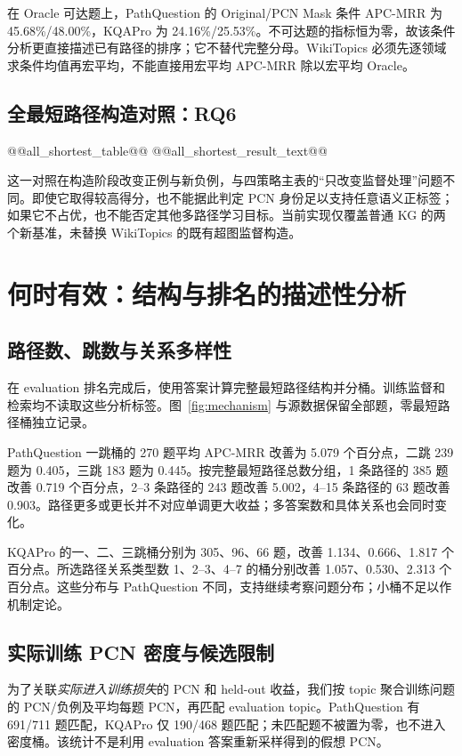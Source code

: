\documentclass[UTF8,a4paper,10pt,fontset=fandol]{ctexart}
\begin{document}
在 Oracle 可达题上，PathQuestion 的 Original/PCN Mask 条件 APC-MRR 为 45.68\%/48.00\%，KQAPro 为 24.16\%/25.53\%。不可达题的指标恒为零，故该条件分析更直接描述已有路径的排序；它不替代完整分母。WikiTopics 必须先逐领域求条件均值再宏平均，不能直接用宏平均 APC-MRR 除以宏平均 Oracle。

\subsection{全最短路径构造对照：RQ6}
@@all_shortest_table@@
@@all_shortest_result_text@@

这一对照在构造阶段改变正例与新负例，与四策略主表的“只改变监督处理”问题不同。即使它取得较高得分，也不能据此判定 PCN 身份足以支持任意语义正标签；如果它不占优，也不能否定其他多路径学习目标。当前实现仅覆盖普通 KG 的两个新基准，未替换 WikiTopics 的既有超图监督构造。

\section{何时有效：结构与排名的描述性分析}
\subsection{路径数、跳数与关系多样性}
在 evaluation 排名完成后，使用答案计算完整最短路径结构并分桶。训练监督和检索均不读取这些分析标签。图~\ref{fig:mechanism} 与源数据保留全部题，零最短路径桶独立记录。

PathQuestion 一跳桶的 270 题平均 APC-MRR 改善为 5.079 个百分点，二跳 239 题为 0.405，三跳 183 题为 0.445。按完整最短路径总数分组，1 条路径的 385 题改善 0.719 个百分点，2--3 条路径的 243 题改善 5.002，4--15 条路径的 63 题改善 0.903。路径更多或更长并不对应单调更大收益；多答案数和具体关系也会同时变化。

KQAPro 的一、二、三跳桶分别为 305、96、66 题，改善 1.134、0.666、1.817 个百分点。所选路径关系类型数 1、2--3、4--7 的桶分别改善 1.057、0.530、2.313 个百分点。这些分布与 PathQuestion 不同，支持继续考察问题分布；小桶不足以作机制定论。

\subsection{实际训练 PCN 密度与候选限制}
为了关联\emph{实际进入训练损失}的 PCN 和 held-out 收益，我们按 topic 聚合训练问题的 PCN/负例及平均每题 PCN，再匹配 evaluation topic。PathQuestion 有 691/711 题匹配，KQAPro 仅 190/468 题匹配；未匹配题不被置为零，也不进入密度桶。该统计不是利用 evaluation 答案重新采样得到的假想 PCN。
\end{document}

